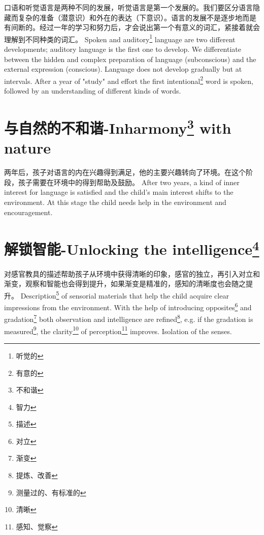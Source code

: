 \documentclass[lang=cn,10pt]{elegantbook}
\begin{document}
\begin{tcolorbox}[title=摘要,
colback=red!5!white,
colframe=red!75!black,
fonttitle=\bfseries]
口语和听觉语言是两种不同的发展，听觉语言是第一个发展的。我们要区分语言隐藏而复杂的准备（潜意识）和外在的表达（下意识）。语言的发展不是逐步地而是有间断的。经过一年的学习和努力后，才会说出第一个有意义的词汇，紧接着就会理解到不同种类的词汇。
Spoken and auditory\footnote{听觉的} language are two different developments; auditory language is the first one to develop. We differentiate between the hidden and complex preparation of language (subconscious) and the external expression (conscious). Language does not develop gradually but at intervals. After a year of "study" and effort the first intentional\footnote{有意的} word is spoken, followed by an understanding of different kinds of words.
\end{tcolorbox}

\chapter{与自然的不和谐-Inharmony\footnote{不和谐} with nature}

\begin{tcolorbox}[title=摘要,
colback=red!5!white,
colframe=red!75!black,
fonttitle=\bfseries]
两年后，孩子对语言的内在兴趣得到满足，他的主要兴趣转向了环境。在这个阶段，孩子需要在环境中的得到帮助及鼓励。
After two years, a kind of inner interest for language is satisfied and the child's main interest shifts to the environment. At this stage the child needs help in the environment and encouragement.
\end{tcolorbox}

\chapter{解锁智能-Unlocking the intelligence\footnote{智力}}

\begin{tcolorbox}[title=摘要,
colback=red!5!white,
colframe=red!75!black,
fonttitle=\bfseries]
对感官教具的描述帮助孩子从环境中获得清晰的印象，感官的独立，再引入对立和渐变，观察和智能也会得到提升，如果渐变是精准的，感知的清晰度也会随之提升。
Description\footnote{描述} of sensorial materials that help the child acquire clear impressions from the environment. With the help of introducing opposites\footnote{对立} and gradation\footnote{渐变} both observation and intelligence are refined\footnote{提炼、改善}, e.g. if the gradation is measured\footnote{测量过的、有标准的}, the clarity\footnote{清晰} of perception\footnote{感知、觉察} improves. Isolation of the senses.
\end{tcolorbox}
\end{document}
